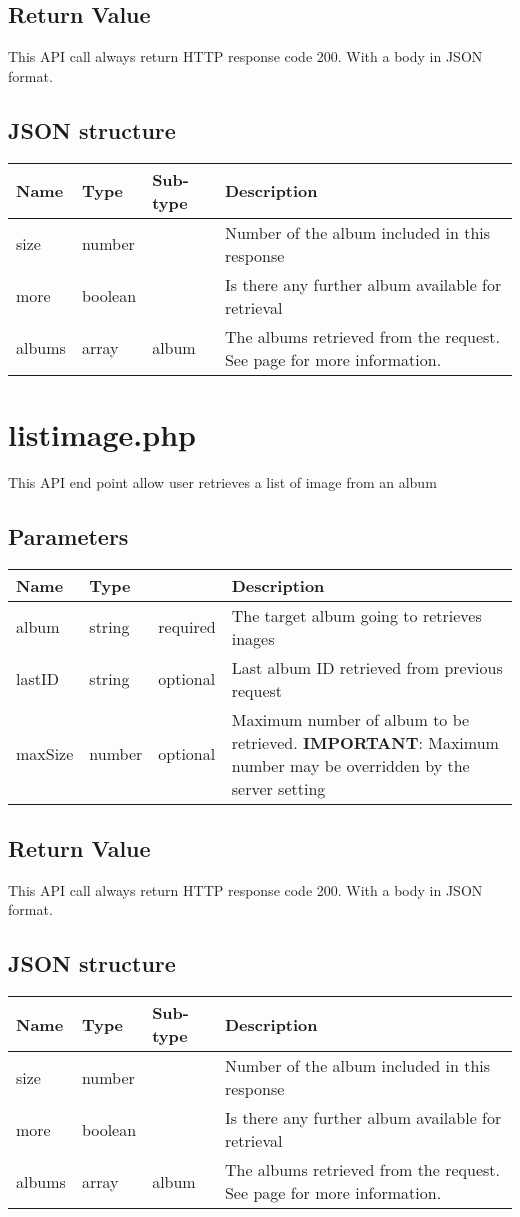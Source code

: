 \documentclass[a4paper,12pt]{report}
\newcommand{\see}[1]{See page \pageref{#1} for more information.}
\begin{document}
	\subsection{Return Value}
	This API call always return HTTP response code 200. With a body in JSON format.
	\subsection{JSON structure}
	\begin{tabular}{|l|l|l|p{10cm}|}
		\hline
		Name & Type & Sub-type & Description\\\hline
		size & number & & Number of the album included in this response\\\hline
		more & boolean & & Is there any further album available for retrieval\\\hline
		albums & array & album & The albums retrieved from the request. \see{obj:album}\\\hline
	\end{tabular}
	
	\section{listimage.php}
	This API end point allow user retrieves a list of image from an album
	\subsection{Parameters}
	\begin{tabular}{|l|ll|p{10cm}|}
		\hline
		Name & Type & & Description\\\hline
		album & string & required & The target album going to retrieves inages\\\hline
		lastID & string & optional & Last album ID retrieved from previous request\\\hline
		maxSize & number & optional & Maximum number of album to be retrieved.\newline
		\textbf{IMPORTANT}: Maximum number may be overridden by the server setting \\\hline
	\end{tabular}
	\subsection{Return Value}
	This API call always return HTTP response code 200. With a body in JSON format.
	\subsection{JSON structure}
	\begin{tabular}{|l|l|l|p{10cm}|}
		\hline
		Name & Type & Sub-type & Description\\\hline
		size & number & & Number of the album included in this response\\\hline
		more & boolean & & Is there any further album available for retrieval\\\hline
		albums & array & album & The albums retrieved from the request. \see{obj:album}\\\hline
	\end{tabular}
	
\end{document}
